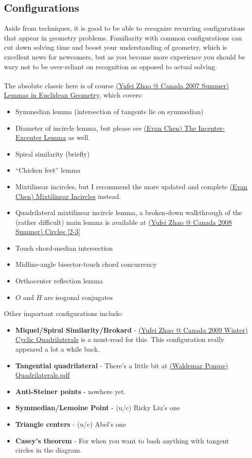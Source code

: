 	\subsection{Configurations}
	Aside from techniques, it is good to be able to recognize recurring configurations that appear in geometry problems. Familiarity with common configurations can cut down solving time and boost your understanding of geometry, which is excellent news for newcomers, but as you become more experience you should be wary not to be over-reliant on recognition as opposed to actual solving.\\\\
	The absolute classic here is of course \href{run:./F_geometry/(Yufei Zhao @ Canada 2007 Summer) Lemmas in Euclidean Geometry.pdf}{(Yufei Zhao @ Canada 2007 Summer) Lemmas in Euclidean Geometry}, which covers:
	\begin{itemize}
	\item Symmedian lemma (intersection of tangents lie on symmedian)
	\item Diameter of incircle lemma, but please see \href{run:./F_geometry/(Evan Chen) The Incenter-Excenter Lemma.pdf}{(Evan Chen) The Incenter-Excenter Lemma} as well.
	\item Spiral similarity (briefly)
	\item ``Chicken feet'' lemma
	\item Mixtilinear incircles, but I recommend the more updated and complete \href{run:./F_geometry/(Evan Chen) Mixtilinear Incircles.pdf}{(Evan Chen) Mixtilinear Incircles} instead.
	\item Quadrilateral mixtilinear incircle lemma, a broken-down walkthrough of the (rather difficult) main lemma is available at \href{run:./F_geometry/(Yufei Zhao @ Canada 2008 Summer) Circles.pdf}{(Yufei Zhao @ Canada 2008 Summer) Circles [2-3]}
	\item Touch chord-median intersection
	\item Midline-angle bisector-touch chord concurrency
	\item Orthocenter reflection lemma
	\item $O$ and $H$ are isogonal conjugates
	\end{itemize}
	Other important configurations include:
	\begin{itemize}
	\item \textbf{Miquel/Spiral Similarity/Brokard} - \href{run:./F_geometry/(Yufei Zhao @ Canada 2009 Winter) Cyclic Quadrilaterals.pdf}{(Yufei Zhao @ Canada 2009 Winter) Cyclic Quadrilaterals} is a must-read for this. This configuration really appeared a lot a while back.
	\item \textbf{Tangential quadrilateral} - There's a little bit at \href{run:./F_Geometry/(Waldemar Pompe) Quadrilaterals.pdf}{(Waldemar Pompe) Quadrilaterals.pdf}
	\item \textbf{Anti-Steiner points} - nowhere yet.
	\item \textbf{Symmedian/Lemoine Point} - (u/c) Ricky Liu's one
	\item \textbf{Triangle centers} - (u/c) Abel's one
	\item \textbf{Casey's theorem} - For when you want to bash anything with tangent circles in the diagram.
	\end{itemize}
